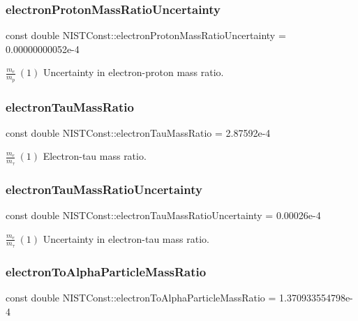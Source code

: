 \subsubsection{\texorpdfstring{electron\+Proton\+Mass\+Ratio\+Uncertainty}{electronProtonMassRatioUncertainty}}
{\footnotesize\ttfamily const double N\+I\+S\+T\+Const\+::electron\+Proton\+Mass\+Ratio\+Uncertainty = 0.\+00000000052e-\/4}

$\frac{m_e}{m_p} \ (1)$ Uncertainty in electron-\/proton mass ratio. \mbox{\label{group___electron_ga513e30853388cdd091c192dfb6371fa8}} 
\subsubsection{\texorpdfstring{electron\+Tau\+Mass\+Ratio}{electronTauMassRatio}}
{\footnotesize\ttfamily const double N\+I\+S\+T\+Const\+::electron\+Tau\+Mass\+Ratio = 2.\+87592e-\/4}

$\frac{m_e}{m_\tau} \ (1)$ Electron-\/tau mass ratio. \mbox{\label{group___electron_ga1550ca2fa257e862b364df16feb6b0ca}} 
\subsubsection{\texorpdfstring{electron\+Tau\+Mass\+Ratio\+Uncertainty}{electronTauMassRatioUncertainty}}
{\footnotesize\ttfamily const double N\+I\+S\+T\+Const\+::electron\+Tau\+Mass\+Ratio\+Uncertainty = 0.\+00026e-\/4}

$\frac{m_e}{m_\tau} \ (1)$ Uncertainty in electron-\/tau mass ratio. \mbox{\label{group___electron_ga1090a3f764cafde391a3dfe7f459a94d}} 
\subsubsection{\texorpdfstring{electron\+To\+Alpha\+Particle\+Mass\+Ratio}{electronToAlphaParticleMassRatio}}
{\footnotesize\ttfamily const double N\+I\+S\+T\+Const\+::electron\+To\+Alpha\+Particle\+Mass\+Ratio = 1.\+370933554798e-\/4}

